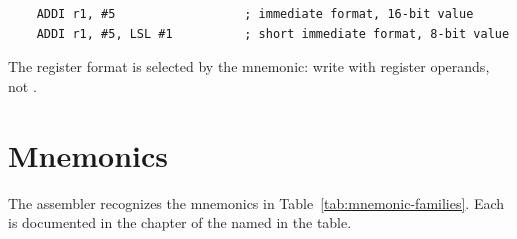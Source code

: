 \begin{lstlisting}
    ADDI r1, #5                  ; immediate format, 16-bit value
    ADDI r1, #5, LSL #1          ; short immediate format, 8-bit value
\end{lstlisting}

The register format is selected by the mnemonic: write  with register operands, not .

\section{Mnemonics}

The assembler recognizes the mnemonics in Table~\ref{tab:mnemonic-families}. Each is documented in the chapter of the
\archmanual{} named in the table.

